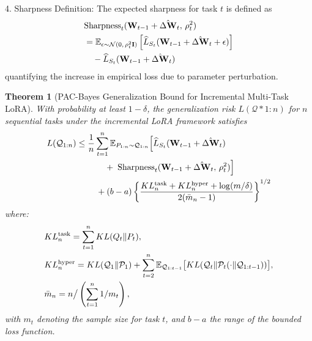\documentclass[letterpaper]{article} %
\newtheorem{theorem}{Theorem}
\begin{document}
4. Sharpness Definition: The expected sharpness for task $t$ is defined as
\begin{align}
&\mathrm{Sharpness}_t(\mathbf{W}_{t-1} + \hat{\Delta\mathbf{W}}_t,\, \rho_t^2) \notag\\
& = \mathbb{E}_{\epsilon \sim \mathcal{N}(0,\, \rho_t^2 \mathbf{I})}
\left[ \widehat{L}_{S_t}(\mathbf{W}_{t-1} + \hat{\Delta\mathbf{W}}_t + \epsilon) \right] \notag\\
&\quad - \widehat{L}_{S_t}(\mathbf{W}_{t-1} + \hat{\Delta\mathbf{W}}_t) \notag
\end{align}
quantifying the increase in empirical loss due to parameter perturbation.

\begin{theorem}[PAC-Bayes Generalization Bound for Incremental Multi-Task LoRA]
With probability at least $1-\delta$, the generalization risk $L(\mathcal{Q}*{1:n})$ for $n$ sequential tasks under the incremental LoRA framework satisfies
\begin{align}
L(\mathcal{Q}_{1:n}) \leq\; & \frac{1}{n} \sum_{t=1}^n 
    \mathbb{E}_{P_{1:n} \sim \mathcal{Q}_{1:n}}
    \Big[
        \widehat{L}_{S_t}(\mathbf{W}_{t-1} + \hat{\Delta\mathbf{W}}_t)
    \notag \\
&\qquad +\; \mathrm{Sharpness}_t(\mathbf{W}_{t-1} + \hat{\Delta\mathbf{W}}_t,\, \rho_t^2)
    \Big] 
    \notag \\
&\quad + (b-a) \left\{ 
    \frac{KL_n^{\text{task}} + KL_n^{\text{hyper}} + \log(m/\delta)}
         {2(\bar{m}_n - 1)}
\right\}^{1/2}
\label{eq:lora-pac-bayes-bound}
\end{align}
where:
\begin{align}
&KL_n^{\mathrm{task}} = \sum_{t=1}^n KL(Q_t\|P_t), \notag  \\
&KL_n^{\mathrm{hyper}} = KL(\mathcal{Q}_1 \| \mathcal{P}_1) + \sum_{t=2}^n \mathbb{E}_{\mathcal{Q}_{1:t-1}}\big[KL(\mathcal{Q}_t \| \mathcal{P}_t(\cdot \| \mathcal{Q}_{1:t-1}))\big], \notag\\
&\bar{m}_n = n \big/ \left(\sum_{t=1}^n 1/m_t\right), \notag
\end{align}
with $m_t$ denoting the sample size for task $t$, and $b-a$ the range of the bounded loss function.
\end{theorem}
\end{document}

